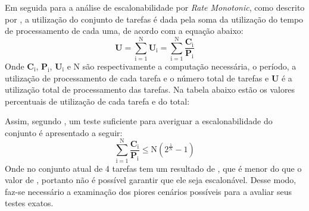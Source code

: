 \documentclass[
	10pt,				%
	openright,			%
	oneside,			%
	a4paper,			%
	english,			%
	french,				%
	spanish,			%
	brazil,				%
	]{abntex2}
\newcommand{\ª}{%
\textordfeminine
}
\begin{document}
\begin{enumerate}
Em seguida para a análise de escalonabilidade por \textit{Rate Monotonic}, como descrito por , a utilização do conjunto de tarefas é dada pela soma da utilização do tempo de processamento de cada uma, de acordo com a equação abaixo:
\begin{equation} \label{eq_1}
	\mathbf{U} = \sum_{\mathrm{i} = 1}^{\mathrm{N}}{\mathbf{U}_{\mathrm{i}}} = \sum_{\mathrm{i} = 1}^{\mathrm{N}}{\frac{\mathbf{C}_{\mathrm{i}}}{\mathbf{P}_{\mathrm{i}}}}
\end{equation}
Onde $\mathbf{C}_{\mathrm{i}}$, $\mathbf{P}_{\mathrm{i}}$, $\mathbf{U}_{\mathrm{i}}$ e N são respectivamente a computação necessária, o período, a utilização de processamento de cada tarefa e o número total de tarefas e $\mathbf{U}$ é a utilização total de processamento das tarefas. Na tabela abaixo estão os valores percentuais de utilização de cada tarefa e do total:
\begin{center}
\end{center}
Assim, segundo , um teste suficiente para averiguar a escalonabilidade do conjunto é apresentado a seguir:
\begin{equation} \label{eq_2}
	\sum_{\mathrm{i} = 1}^{\mathrm{N}}{\frac{\mathbf{C}_{\mathrm{i}}}{\mathbf{P}_{\mathrm{i}}}} \le \mathrm{N} \left( 2^{\frac{1}{\mathrm{N}}} - 1 \right)
\end{equation}
Onde no conjunto atual de 4 tarefas tem um resultado de , que é menor do que o valor de , portanto não é possível garantir que ele seja escalonável. Desse modo, faz-se necessário a examinação dos piores cenários possíveis para a avaliar seus testes exatos.


\end{enumerate}
\end{document}

